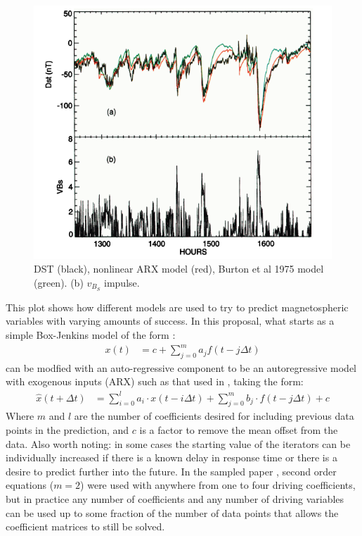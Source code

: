 \documentclass[10pt]{article}
\begin{document}
\begin{figure}[htp]
\centering
\includegraphics[scale=0.40]{VBzIR.png}
\caption{DST (black), nonlinear ARX model (red), Burton et al 1975 model (green). (b) $v_{B_S}$ impulse.\citep{ARXEqn}}
\label{VBzIRplot}
\end{figure}

This plot shows how different models are used to try to predict magnetospheric variables with varying amounts of success. In this proposal, what starts as a simple Box-Jenkins model of the form \citep{DOYvar}:
\begin{align*}
x(t)&=c+\sum_{j=0}^{m}{a_j f(t-j\Delta t)}
\end{align*}
can be modfied with an auto-regressive component to be an autoregressive model with exogenous inputs (ARX) such as that used in \citep{ARXEqn}, taking the form:
\begin{align}
\hat{x}(t+\Delta t)&=\sum_{i=0}^la_i\cdot x(t-i\Delta t)+\sum_{j=0}^m b_j\cdot f(t-j\Delta t)+c
\label{ARXEqn}
\end{align}
Where $m$ and $l$ are the number of coefficients desired for including previous data points in the prediction, and $c$ is a factor to remove the mean offset from the data. Also worth noting: in some cases the starting value of the iterators can be individually increased if there is a known delay in response time or there is a desire to predict further into the future. In the sampled paper \citep{ARXEqn}, second order equations ($m=2$) were used with anywhere from one to four driving coefficients, but in practice any number of coefficients and any number of driving variables can be used up to some fraction of the number of data points that allows the coefficient matrices to still be solved. 
\end{document}
